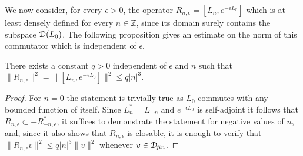 \documentclass[12pt]{article}
\begin{document}
We now consider, for every $\epsilon >0$, the operator 
$R_{n,\epsilon}=[L_n,e^{-\epsilon L_0}]$ which is at least densely defined 
for every $n \in {\mathbb Z}$, since its domain surely contains the 
subspace ${\mathcal D}(L_0)$. The following proposition gives an estimate on the norm of
this commutator which is independent of $\epsilon$. 
\begin{proposition}
\label{commutatornorm}
There exists a constant $q > 0$ independent of $\epsilon$ and $n$ such
that $\|R_{n,\epsilon}\|^2=\|[L_n,e^{-\epsilon L_0}]\|^2 \leq q |n|^3$.
\end{proposition}
\begin{proof}
For $n=0$ the statement is trivially true as $L_0$ 
commutes with any bounded function of itself. Since $L_n^*=L_{-n}$ 
and $e^{-\epsilon L_0}$ is self-adjoint it follows that
$R_{n,\epsilon} \subset -R_{-n,\epsilon}^*$, 
it suffices to demonstrate the
statement for negative values of $n$, 
and, since it also shows that $R_{n,\epsilon}$ is closable,
it is enough to verify that $\|R_{n,\epsilon}v\|^2 \leq 
q |n|^3 \|v\|^2$ whenever $v \in {\mathcal D}\!_{f\!in}$.


\end{proof}
\end{document}

